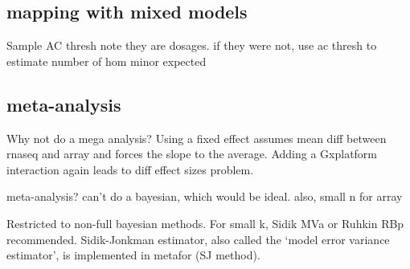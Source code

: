 \subsection{ mapping with mixed models}


Sample AC thresh
    note they are dosages. if they were not, use ac thresh to estimate number of hom minor expected

\subsection{ meta-analysis}

Why not do a mega analysis? 
Using a fixed effect assumes mean diff between rnaseq and array and forces the slope to the average.
Adding a Gxplatform interaction again leads to diff effect sizes problem.

meta-analysis?
can't do a bayesian, which would be ideal.
also, small n for array


Restricted to non-full bayesian methods.
For small k, Sidik MVa or Ruhkin RBp recommended.
Sidik-Jonkman estimator, also called the ‘model error variance estimator’, is implemented in metafor (SJ method).

